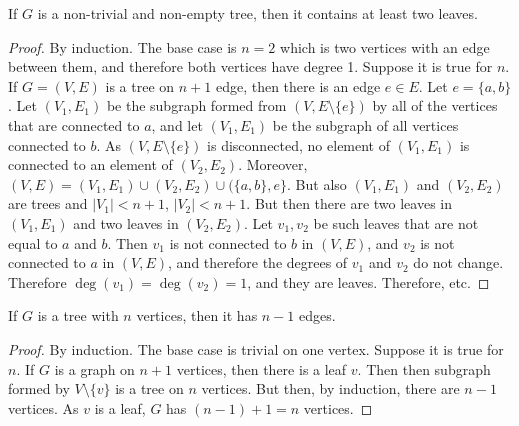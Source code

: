 \documentclass[crop=false,class=book,oneside]{standalone}
\begin{document}
            \begin{theorem}
                If $G$ is a non-trivial and non-empty tree, then
                it contains at least two leaves.
            \end{theorem}
            \begin{proof}
                By induction. The base case is $n=2$ which is
                two vertices with an edge between them, and therefore
                both vertices have degree 1. Suppose it is true for $n$.
                If $G=(V,E)$ is a tree on $n+1$ edge, then there is
                an edge $e\in{E}$. Let $e=\{a,b\}$. Let
                $(V_{1},E_{1})$ be the subgraph formed from
                $(V,E\setminus\{e\})$ by all of the vertices that are
                connected to $a$, and let $(V_{1},E_{1})$ be the
                subgraph of all vertices connected to $b$. As
                $(V,E\setminus\{e\})$ is disconnected,
                no element of $(V_{1},E_{1})$ is connected to an element
                of $(V_{2},E_{2})$. Moreover,
                $(V,E)=(V_{1},E_{1})\cup(V_{2},E_{2})\cup(\{a,b\},e\}$.
                But also $(V_{1},E_{1})$ and $(V_{2},E_{2})$ are trees
                and $|V_{1}|<n+1$, $|V_{2}|<n+1$. But then there are
                two leaves in $(V_{1},E_{1})$ and two leaves in
                $(V_{2},E_{2})$. Let $v_{1},v_{2}$ be such leaves that
                are not equal to $a$ and $b$. Then
                $v_{1}$ is not connected to $b$ in $(V,E)$, and
                $v_{2}$ is not connected to $a$ in $(V,E)$, and therefore
                the degrees of $v_{1}$ and $v_{2}$ do not change.
                Therefore $\deg(v_{1})=\deg(v_{2})=1$, and they are
                leaves. Therefore, etc.
            \end{proof}
            \begin{theorem}
                If $G$ is a tree with $n$ vertices, then it has
                $n-1$ edges.
            \end{theorem}
            \begin{proof}
                By induction. The base case is trivial on one vertex.
                Suppose it is true for $n$. If $G$ is a graph on
                $n+1$ vertices, then there is a leaf $v$.
                Then then subgraph formed by
                $V\setminus\{v\}$ is a tree on $n$ vertices. But then,
                by induction, there are $n-1$ vertices. As $v$ is a leaf,
                $G$ has $(n-1)+1=n$ vertices.
            \end{proof}
\end{document}
